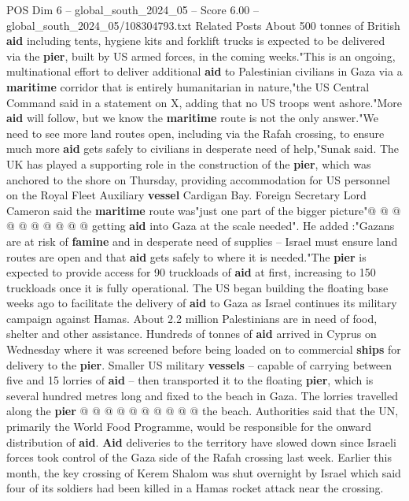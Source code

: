 \begin{textsample}{POS Dim 6 – global\_south\_2024\_05 – Score 6.00 – global\_south\_2024\_05/108304793.txt}  \label{ex:f6_pos_156}
Related Posts About 500 tonnes of British \textbf{aid} including tents, hygiene kits and forklift trucks is expected to be delivered via the \textbf{pier}, built by US armed forces, in the coming weeks."This is an ongoing, multinational effort to deliver additional \textbf{aid} to Palestinian civilians in Gaza via a \textbf{maritime} corridor that is entirely humanitarian in nature,"the US Central Command said in a statement on X, adding that no US troops went ashore."More \textbf{aid} will follow, but we know the \textbf{maritime} route is not the only answer."We need to see more land routes open, including via the Rafah crossing, to ensure much more \textbf{aid} gets safely to civilians in desperate need of help,"Sunak said.
The UK has played a supporting role in the construction of the \textbf{pier}, which was anchored to the shore on Thursday, providing accommodation for US personnel on the Royal Fleet Auxiliary \textbf{vessel} Cardigan Bay.
Foreign Secretary Lord Cameron said the \textbf{maritime} route was"just one part of the bigger picture"@ @ @ @ @ @ @ @ @ @ getting \textbf{aid} into Gaza at the scale needed".
He added :"Gazans are at risk of \textbf{famine} and in desperate need of supplies -- Israel must ensure land routes are open and that \textbf{aid} gets safely to where it is needed."The \textbf{pier} is expected to provide access for 90 truckloads of \textbf{aid} at first, increasing to 150 truckloads once it is fully operational.
The US began building the floating base weeks ago to facilitate the delivery of \textbf{aid} to Gaza as Israel continues its military campaign against Hamas.
About 2.2 million Palestinians are in need of food, shelter and other assistance.
Hundreds of tonnes of \textbf{aid} arrived in Cyprus on Wednesday where it was screened before being loaded on to commercial \textbf{ships} for delivery to the \textbf{pier}.
Smaller US military \textbf{vessels} -- capable of carrying between five and 15 lorries of \textbf{aid} -- then transported it to the floating \textbf{pier}, which is several hundred metres long and fixed to the beach in Gaza.
The lorries travelled along the \textbf{pier} @ @ @ @ @ @ @ @ @ @ the beach.
Authorities said that the UN, primarily the World Food Programme, would be responsible for the onward distribution of \textbf{aid}. \textbf{Aid} deliveries to the territory have slowed down since Israeli forces took control of the Gaza side of the Rafah crossing last week.
Earlier this month, the key crossing of Kerem Shalom was shut overnight by Israel which said four of its soldiers had been killed in a Hamas rocket attack near the crossing.

\end{textsample}
